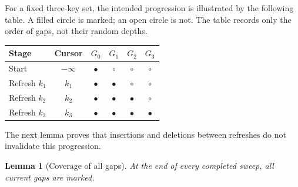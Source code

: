 \documentclass[11pt,a4paper]{article}
\theoremstyle{readable}
\newtheorem{lemma}[theorem]{Lemma}
\begin{document}
For a fixed three-key set, the intended progression is illustrated by
the following table. A filled circle is marked; an open circle is not.
The table records only the order of gaps, not their random depths.
\begin{center}
\begin{tabular}{lccccc}
\toprule
Stage & Cursor & $G_0$ & $G_1$ & $G_2$ & $G_3$ \\
\midrule
Start & $-\infty$ & $\bullet$ & $\circ$ & $\circ$ & $\circ$ \\
Refresh $k_1$ & $k_1$ & $\bullet$ & $\bullet$ & $\circ$ & $\circ$ \\
Refresh $k_2$ & $k_2$ & $\bullet$ & $\bullet$ & $\bullet$ & $\circ$ \\
Refresh $k_3$ & $k_3$ & $\bullet$ & $\bullet$ & $\bullet$ & $\bullet$ \\
\bottomrule
\end{tabular}
\end{center}
The next lemma proves that insertions and deletions between refreshes
do not invalidate this progression.

\begin{lemma}[Coverage of all gaps]
\label{lem:coverage}
At the end of every completed sweep, all current gaps are marked.
\end{lemma}
\end{document}
